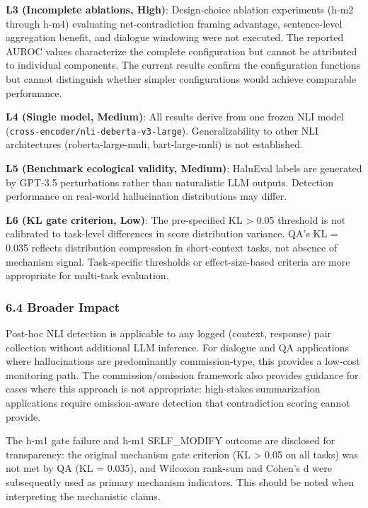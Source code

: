 \textbf{L3 (Incomplete ablations, High)}: Design-choice ablation experiments (h-m2 through h-m4) evaluating net-contradiction framing advantage, sentence-level aggregation benefit, and dialogue windowing were not executed. The reported AUROC values characterize the complete configuration but cannot be attributed to individual components. The current results confirm the configuration functions but cannot distinguish whether simpler configurations would achieve comparable performance.

\textbf{L4 (Single model, Medium)}: All results derive from one frozen NLI model (\texttt{cross-encoder/nli-deberta-v3-large}). Generalizability to other NLI architectures (roberta-large-mnli, bart-large-mnli) is not established.

\textbf{L5 (Benchmark ecological validity, Medium)}: HaluEval labels are generated by GPT-3.5 perturbations rather than naturalistic LLM outputs. Detection performance on real-world hallucination distributions may differ.

\textbf{L6 (KL gate criterion, Low)}: The pre-specified KL > 0.05 threshold is not calibrated to task-level differences in score distribution variance. QA's KL = 0.035 reflects distribution compression in short-context tasks, not absence of mechanism signal. Task-specific thresholds or effect-size-based criteria are more appropriate for multi-task evaluation.

\subsubsection{6.4 Broader Impact}

Post-hoc NLI detection is applicable to any logged (context, response) pair collection without additional LLM inference. For dialogue and QA applications where hallucinations are predominantly commission-type, this provides a low-cost monitoring path. The commission/omission framework also provides guidance for cases where this approach is not appropriate: high-stakes summarization applications require omission-aware detection that contradiction scoring cannot provide.

The h-m1 gate failure and h-m1 SELF\_MODIFY outcome are disclosed for transparency: the original mechanism gate criterion (KL > 0.05 on all tasks) was not met by QA (KL = 0.035), and Wilcoxon rank-sum and Cohen's d were subsequently used as primary mechanism indicators. This should be noted when interpreting the mechanistic claims.
